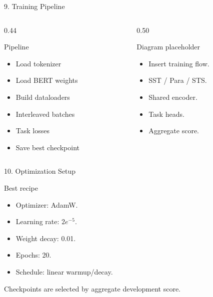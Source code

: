 \documentclass[t, aspectratio=169]{beamer}
\begin{document}
\begin{frame}{9. Training Pipeline}
    \begin{columns}[T]
        \begin{column}{0.44\textwidth}
            \begin{block}{Pipeline}
                \begin{itemize}
                    \item Load tokenizer
                    \item Load BERT weights
                    \item Build dataloaders
                    \item Interleaved batches
                    \item Task losses
                    \item Save best checkpoint
                \end{itemize}
            \end{block}
        \end{column}
        \begin{column}{0.50\textwidth}
            \begin{alertblock}{Diagram placeholder}
                \begin{itemize}
                    \item Insert training flow.
                    \item SST / Para / STS.
                    \item Shared encoder.
                    \item Task heads.
                    \item Aggregate score.
                \end{itemize}
            \end{alertblock}
        \end{column}
    \end{columns}
\end{frame}

\begin{frame}{10. Optimization Setup}
    \begin{block}{Best recipe}
        \begin{itemize}
            \item Optimizer: AdamW.
            \item Learning rate: $2e^{-5}$.
            \item Weight decay: 0.01.
            \item Epochs: 20.
            \item Schedule: linear warmup/decay.
        \end{itemize}
    \end{block}

    \vspace{0.5em}
    Checkpoints are selected by aggregate development score.
\end{frame}
\end{document}
